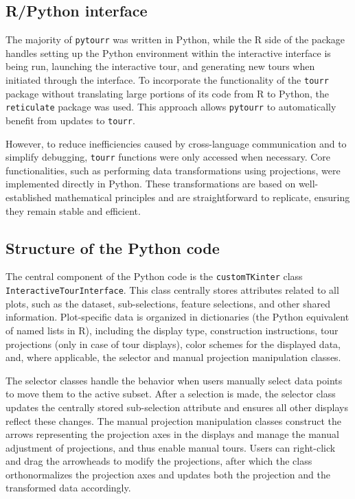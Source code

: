 \documentclass[article]{ajs}
\begin{document}
\subsection{R/Python interface}

The majority of \texttt{pytourr} was written in Python, while the R side of the package handles setting up the Python environment within the interactive interface is being run, launching the interactive tour, and generating new tours when initiated through the interface. To incorporate the functionality of the \texttt{tourr} package without translating large portions of its code from R to Python, the \texttt{reticulate} package was used. This approach allows \texttt{pytourr} to automatically benefit from updates to \texttt{tourr}.

However, to reduce inefficiencies caused by cross-language communication and to simplify debugging, \texttt{tourr} functions were only accessed when necessary. Core functionalities, such as performing data transformations using projections, were implemented directly in Python. These transformations are based on well-established mathematical principles and are straightforward to replicate, ensuring they remain stable and efficient.

\subsection{Structure of the Python code}

The central component of the Python code is the \texttt{customTKinter} class \texttt{InteractiveTourInterface}. This class centrally stores attributes related to all plots, such as the dataset, sub-selections, feature selections, and other shared information. Plot-specific data is organized in dictionaries (the Python equivalent of named lists in R), including the display type, construction instructions, tour projections (only in case of tour displays), color schemes for the displayed data, and, where applicable, the selector and manual projection manipulation classes.

The selector classes handle the behavior when users manually select data points to move them to the active subset. After a selection is made, the selector class updates the centrally stored sub-selection attribute and ensures all other displays reflect these changes. The manual projection manipulation classes construct the arrows representing the projection axes in the displays and manage the manual adjustment of projections, and thus enable manual tours. Users can right-click and drag the arrowheads to modify the projections, after which the class orthonormalizes the projection axes and updates both the projection and the transformed data accordingly.
\end{document}
